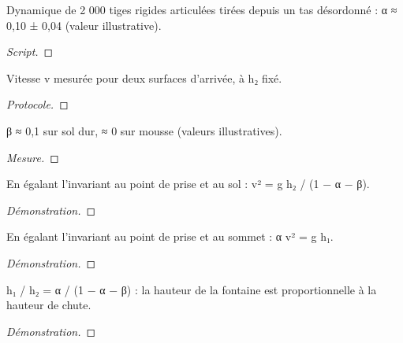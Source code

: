 \begin{calcul}\label{calc_tiges}
Dynamique de 2 000 tiges rigides articulées tirées depuis un tas désordonné : α ≈ 0,10 ± 0,04 (valeur illustrative).
\end{calcul}
\begin{proof}[Script]
\end{proof}

\begin{experience}\label{exp_sol}
Vitesse v mesurée pour deux surfaces d’arrivée, à h₂ fixé.
\end{experience}
\begin{proof}[Protocole]
\end{proof}

\begin{observation}[β faible]\label{obs_beta}
β ≈ 0,1 sur sol dur, ≈ 0 sur mousse (valeurs illustratives).
\end{observation}
\begin{proof}[Mesure]
\end{proof}

\begin{proposition}\label{p_vitesse}
En égalant l’invariant au point de prise et au sol : v² = g h₂ / (1 − α − β).
\end{proposition}
\begin{proof}[Démonstration]
\end{proof}

\begin{proposition}\label{p_hauteur}
En égalant l’invariant au point de prise et au sommet : α v² = g h₁.
\end{proposition}
\begin{proof}[Démonstration]
\end{proof}

\begin{theoreme}\label{thm_rapport}
h₁ / h₂ = α / (1 − α − β) : la hauteur de la fontaine est proportionnelle à la hauteur de chute.
\end{theoreme}
\begin{proof}[Démonstration]
\end{proof}

